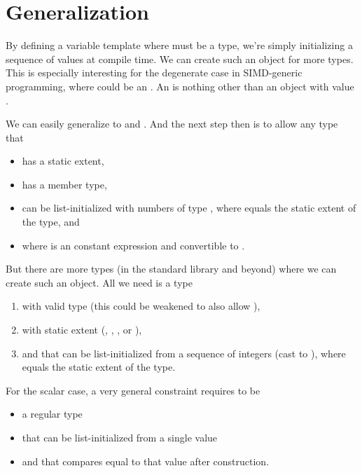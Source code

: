\section{Generalization}
By defining a variable template \std{} where  must
be a \simd type, we're simply initializing a sequence of values at compile time.
We can create such an object for more types.
This is especially interesting for the degenerate case in SIMD-generic
programming, where  could \eg be an .
An \std{} is nothing other than an object  with value
.

We can easily generalize to  and
.
And the next step then is to allow any type that
\begin{itemize}
  \item has a static extent,
  \item has a  member type,
  \item can be list-initialized with  numbers of type
    , where  equals the static extent of the type, and
  \item where  is an constant expression and convertible to .
\end{itemize}

But there are more types (in the standard library and beyond) where we can
create such an object.
All we need is a type
\begin{enumerate}
  \item with valid  type (this could be weakened
    to also allow ),
  \item with static extent (, ,
    , or ),
  \item and that can be list-initialized from a sequence of 
    integers (cast to ), where  equals
    the static extent of the type.
\end{enumerate}
For the scalar case, a very general constraint requires  to be
\begin{itemize}
  \item a regular type
  \item that can be list-initialized from a single value
  \item and that compares equal to that value after construction.
\end{itemize}

